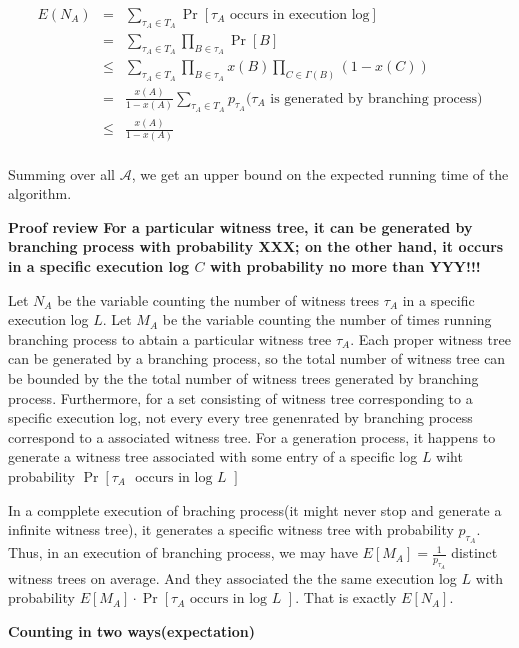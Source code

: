 \documentclass[twoside]{article}
\begin{document}
\begin{eqnarray*}
E(N_A)&=& \sum_{\tau_A\in T_A}\Pr[\tau_A\mbox{~occurs in execution log}]\\
&=&\sum_{\tau_A\in T_A}\prod_{B\in\tau_A}\Pr[B] \\
&\leq &\sum_{\tau_A\in T_A}\prod_{B\in\tau_A}x(B)\prod_{C\in\Gamma(B)}(1-x(C)) \\
&=&\frac{x(A)}{1-x(A)}\sum_{\tau_A\in T_A} p_{\tau_A}(\tau_A
\mbox{~is generated by branching process)}\\
&\leq &\frac{x(A)}{1-x(A)}\\
\end{eqnarray*}

Summing over all $\mathcal{A}$, we get an upper bound on the expected running time of the algorithm.

\textbf{Proof review}
\textbf{For a particular witness tree, it can be generated by branching process with probability XXX; on the other hand, it occurs in a specific execution log $C$ with probability no more than YYY!!!}

Let $N_A$ be the variable counting the number of witness trees $\tau_A$ in a specific execution log $L$. Let $M_A$ be the variable counting the number of times running branching process to abtain a particular witness tree $\tau_A$.
Each proper witness tree can be generated by a branching process, so the total number of witness tree can be bounded by the the total number of witness trees generated by branching process. Furthermore, for a set consisting of witness tree corresponding to a specific execution log, not every every tree genenrated by branching process correspond to a associated witness tree. For a generation process, it happens to generate a witness tree associated with some entry of a specific log $L$ wiht probability $\Pr[\tau_A\mbox{~ occurs in log $L$~}]$

In a compplete execution of braching process(it might never stop and generate a infinite witness tree), it generates a specific witness tree with probability $p_{\tau_A}$. Thus, in an execution of branching process, we may have $E[M_A]=\frac{1}{p_{\tau_A}}$ distinct witness trees on average. And they associated the the same execution log $L$ with probability $E[M_A]\cdot \Pr[\tau_A\mbox{~occurs in log $L$~}]$. That is exactly $E[N_A]$.

\textbf{Counting in two ways(expectation)}
\end{document}
